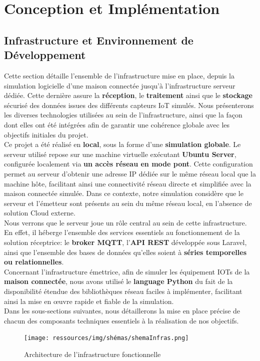\documentclass[10pt, a4paper]{report}
\begin{document}
	
	\chapter{Conception et Implémentation}
	
	\section{Infrastructure et Environnement de Développement}
	Cette section détaille l'ensemble de l’infrastructure mise en place, depuis la simulation logicielle d'une maison connectée jusqu'à l'infrastructure serveur dédiée. Cette dernière assure la \textbf{réception}, le \textbf{traitement} ainsi que le \textbf{stockage} sécurisé des données issues des différents capteurs IoT simulés. Nous présenterons les diverses technologies utilisées au sein de l'infrastructure, ainsi que la façon dont elles ont été intégrées afin de garantir une cohérence globale avec les objectifs initiales du projet.\\
	Ce projet a été réalisé en \textbf{local}, sous la forme d'une \textbf{simulation globale}. Le serveur utilisé repose sur une machine virtuelle exécutant \textbf{Ubuntu Server}, configurée localement via \textbf{un accès réseau en mode pont}. Cette configuration permet au serveur d'obtenir une adresse IP dédiée sur le même réseau local que la machine hôte, facilitant ainsi une connectivité réseau directe et simplifiée avec la maison connectée simulée. Dans ce contexte, notre simulation considère que le serveur et l’émetteur sont présents au sein du même réseau local, en l'absence de solution Cloud externe.\\
	Nous verrons que le serveur joue un rôle central au sein de cette infrastructure. En effet, il héberge l'ensemble des services essentiels au fonctionnement de la solution réceptrice: le \textbf{broker MQTT}, l'\textbf{API REST} développée sous Laravel, ainsi que l'ensemble des bases de données qu'elles soient à\textbf{ séries temporelles ou relationnelles}.\\
	Concernant l'infrastructure émettrice, afin de simuler les équipement IOTs de la \textbf{maison connectée}, nous avons utilisé le\textbf{ language Python} du fait de la disponibilité étendue des bibliothèques réseau faciles à implémenter, facilitant ainsi la mise en œuvre rapide et fiable de la simulation. \\
	Dans les sous-sections suivantes, nous détaillerons la mise en place précise de chacun des composants techniques essentiels à la réalisation de nos objectifs.
		\begin{figure}[h!]
		\centering
		\texttt{[image: ressources/img/shémas/shemaInfras.png]}
		\caption{Architecture de l'infrastructure fonctionnelle}
		\label{fig:archiInfra}
	\end{figure}
	
\end{document}
